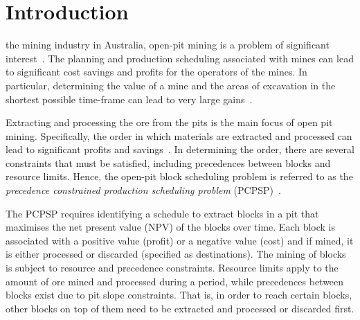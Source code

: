 \documentclass[journal]{IEEEtran}
\begin{document}
\section{Introduction}\label{sec:intro}
 the mining industry in Australia, open-pit mining is a problem of significant interest~\cite{Newman:2010}. The planning and production scheduling 
associated with mines can lead to significant cost savings and profits for the operators of the mines. In particular, determining the value of a mine 
and the areas of excavation in the shortest possible time-frame can lead to very large gains~\cite{Meagher2014}. 

Extracting and processing the ore from the pits is the main focus of open pit mining. Specifically, the order in which materials are extracted and processed 
can lead to significant profits and savings~\cite{Meagher2014}. In determining the order, there are several constraints that must be satisfied, including precedences between blocks and resource limits. Hence, the open-pit block scheduling problem is referred to as the {\it precedence constrained production scheduling problem} (PCPSP)~\cite{Bley:2010,
espinoza_minelib:_2012}. 

The PCPSP requires  identifying a schedule to extract blocks in a pit that maximises the net present value (NPV) of the blocks over time. Each block is associated 
with a positive value (profit) or a negative value (cost) and if mined, it is either processed or discarded (specified as destinations). The mining of 
blocks is subject to resource and precedence constraints. Resource limits apply to the amount of ore mined and processed during a period, while precedences 
between blocks exist due to pit slope constraints. That is, in order to reach certain blocks, other blocks on top of them need to be extracted and processed or 
discarded first.
\end{document}
